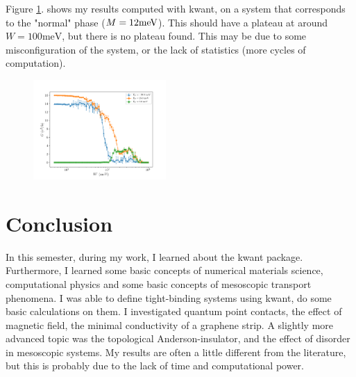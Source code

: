 \documentclass[11pt, a4paper, twocolumn]{article}
\begin{document}
Figure \ref{fig:tai_results_params1_nsamples=4}. shows my results computed with kwant, on a system that corresponds
to the "normal" phase ($M=12\textnormal{meV}$). This should have a plateau at around $W=100\textrm{meV}$, but there
is no plateau found. This may be due to some misconfiguration of the system, or the lack of statistics (more 
cycles of computation).
\begin{figure}[H]
  \begin{center}
  \includegraphics[width=0.45\textwidth]{./media/tai_results_params1_nsamples=4.png}
  \caption{}
  \label{fig:tai_results_params1_nsamples=4}
  \end{center}
\end{figure}

\section*{Conclusion}
In this semester, during my work, I learned about the kwant package. Furthermore, I learned some basic concepts
of numerical materials science, computational physics and some basic concepts of mesoscopic transport phenomena.
I was able to define tight-binding systems using kwant, do some basic calculations on them. I investigated
quantum point contacts, the effect of magnetic field, the minimal conductivity of a graphene strip.
A slightly more advanced topic was the topological Anderson-insulator, and the effect of disorder in
mesoscopic systems. My results are often a little different from the literature, but this is probably due 
to the lack of time and computational power.

\nocite{*}



\end{document}
